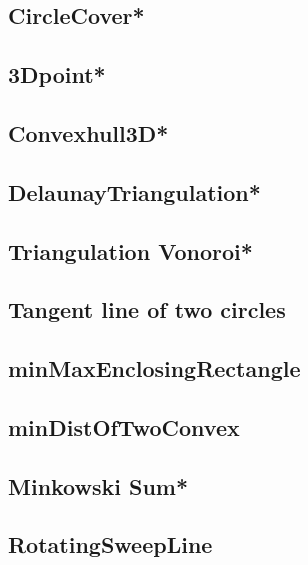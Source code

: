 \subsection{CircleCover*} %

\subsection{3Dpoint*} %

\subsection{Convexhull3D*} %

\subsection{DelaunayTriangulation*} %

\subsection{Triangulation Vonoroi*} %

\subsection{Tangent line of two circles}

\subsection{minMaxEnclosingRectangle}

\subsection{minDistOfTwoConvex}

\subsection{Minkowski Sum*} %

\subsection{RotatingSweepLine}


